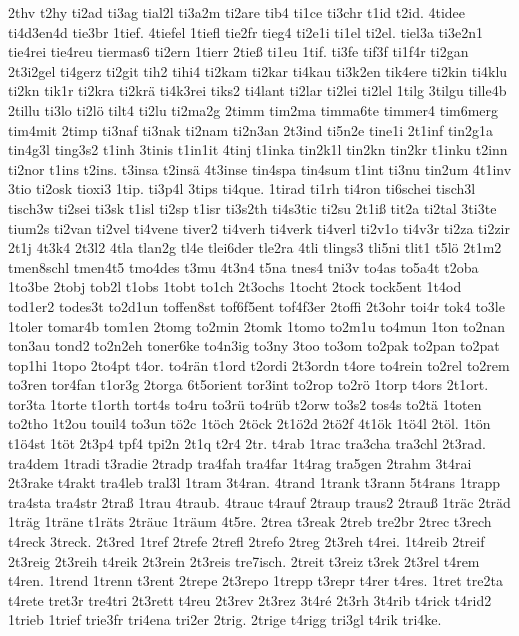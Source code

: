 {2thv
t2hy
ti2ad
ti3ag
tial2l
ti3a2m
ti2are
tib4
ti1ce
ti3chr
t1id
t2id.
4tidee
ti4d3en4d
tie3br
1tief.
4tiefel
1tiefl
tie2fr
tieg4
ti2e1i
ti1el
ti2el.
tiel3a
ti3e2n1
tie4rei
tie4reu
tiermas6
ti2ern
1tierr
2tieß
ti1eu
1tif.
ti3fe
tif3f
ti1f4r
ti2gan
2t3i2gel
ti4gerz
ti2git
tih2
tihi4
ti2kam
ti2kar
ti4kau
ti3k2en
tik4ere
ti2kin
ti4klu
ti2kn
tik1r
ti2kra
ti2krä
ti4k3rei
tiks2
ti4lant
ti2lar
ti2lei
ti2lel
1tilg
3tilgu
tille4b
2tillu
ti3lo
ti2lö
tilt4
ti2lu
ti2ma2g
2timm
tim2ma
timma6te
timmer4
tim6merg
tim4mit
2timp
ti3naf
ti3nak
ti2nam
ti2n3an
2t3ind
ti5n2e
tine1i
2t1inf
tin2g1a
tin4g3l
ting3s2
t1inh
3tinis
t1in1it
4tinj
t1inka
tin2k1l
tin2kn
tin2kr
t1inku
t2inn
ti2nor
t1ins
t2ins.
t3insa
t2insä
4t3inse
tin4spa
tin4sum
t1int
ti3nu
tin2um
4t1inv
3tio
ti2osk
tioxi3
1tip.
ti3p4l
3tips
ti4que.
1tirad
ti1rh
ti4ron
ti6schei
tisch3l
tisch3w
ti2sei
ti3sk
t1isl
ti2sp
t1isr
ti3s2th
ti4s3tic
ti2su
2t1iß
tit2a
ti2tal
3ti3te
tium2s
ti2van
ti2vel
ti4vene
tiver2
ti4verh
ti4verk
ti4verl
ti2v1o
ti4v3r
ti2za
ti2zir
2t1j
4t3k4
2t3l2
4tla
tlan2g
tl4e
tlei6der
tle2ra
4tli
tlings3
tli5ni
tlit1
t5lö
2t1m2
tmen8schl
tmen4t5
tmo4des
t3mu
4t3n4
t5na
tnes4
tni3v
to4as
to5a4t
t2oba
1to3be
2tobj
tob2l
t1obs
1tobt
to1ch
2t3ochs
1tocht
2tock
tock5ent
1t4od
tod1er2
todes3t
to2d1un
toffen8st
tof6f5ent
tof4f3er
2toffi
2t3ohr
toi4r
tok4
to3le
1toler
tomar4b
tom1en
2tomg
to2min
2tomk
1tomo
to2m1u
to4mun
1ton
to2nan
ton3au
tond2
to2n2eh
toner6ke
to4n3ig
to3ny
3too
to3om
to2pak
to2pan
to2pat
top1hi
1topo
2to4pt
t4or.
to4rän
t1ord
t2ordi
2t3ordn
t4ore
to4rein
to2rel
to2rem
to3ren
tor4fan
t1or3g
2torga
6t5orient
tor3int
to2rop
to2rö
1torp
t4ors
2t1ort.
tor3ta
1torte
t1orth
tort4s
to4ru
to3rü
to4rüb
t2orw
to3s2
tos4s
to2tä
1toten
to2tho
1t2ou
touil4
to3un
tö2c
1töch
2töck
2t1ö2d
2tö2f
4t1ök
1tö4l
2töl.
1tön
t1ö4st
1töt
2t3p4
tpf4
tpi2n
2t1q
t2r4
2tr.
t4rab
1trac
tra3cha
tra3chl
2t3rad.
tra4dem
1tradi
t3radie
2tradp
tra4fah
tra4far
1t4rag
tra5gen
2trahm
3t4rai
2t3rake
t4rakt
tra4leb
tral3l
1tram
3t4ran.
4trand
1trank
t3rann
5t4rans
1trapp
tra4sta
tra4str
2traß
1trau
4traub.
4trauc
t4rauf
2traup
traus2
2trauß
1träc
2träd
1träg
1träne
t1räts
2träuc
1träum
4t5re.
2trea
t3reak
2treb
tre2br
2trec
t3rech
t4reck
3treck.
2t3red
1tref
2trefe
2trefl
2trefo
2treg
2t3reh
t4rei.
1t4reib
2treif
2t3reig
2t3reih
t4reik
2t3rein
2t3reis
tre7isch.
2treit
t3reiz
t3rek
2t3rel
t4rem
t4ren.
1trend
1trenn
t3rent
2trepe
2t3repo
1trepp
t3repr
t4rer
t4res.
1tret
tre2ta
t4rete
tret3r
tre4tri
2t3rett
t4reu
2t3rev
2t3rez
3t4ré
2t3rh
3t4rib
t4rick
t4rid2
1trieb
1trief
trie3fr
tri4ena
tri2er
2trig.
2trige
t4rigg
tri3gl
t4rik
tri4ke.
}
